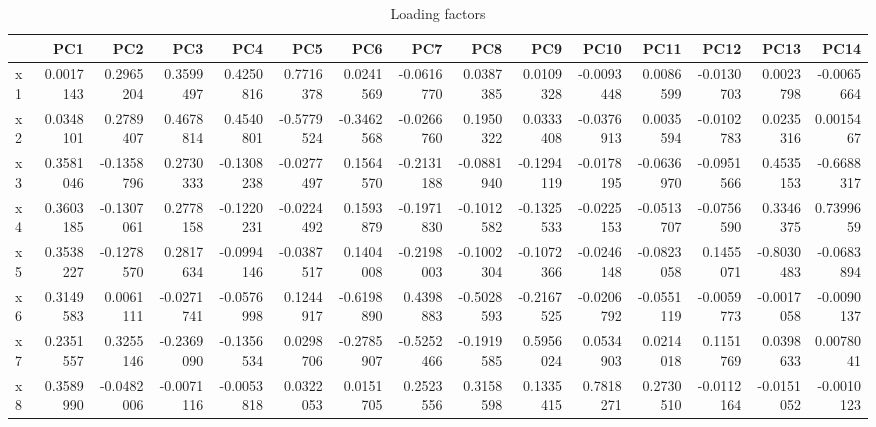 \documentclass[
]{book}
\newenvironment{Shaded}{\begin{snugshade}}{\end{snugshade}}
\newcommand{\AttributeTok}[1]{\textcolor[rgb]{0.77,0.63,0.00}{#1}}
\newcommand{\CommentTok}[1]{\textcolor[rgb]{0.56,0.35,0.01}{\textit{#1}}}
\newcommand{\ConstantTok}[1]{\textcolor[rgb]{0.00,0.00,0.00}{#1}}
\newcommand{\FunctionTok}[1]{\textcolor[rgb]{0.00,0.00,0.00}{#1}}
\newcommand{\NormalTok}[1]{#1}
\newcommand{\SpecialCharTok}[1]{\textcolor[rgb]{0.00,0.00,0.00}{#1}}
\newcommand{\StringTok}[1]{\textcolor[rgb]{0.31,0.60,0.02}{#1}}
\begin{document}
\begin{Shaded}
\end{Shaded}

\begin{table}

\caption{\label{tab:unnamed-chunk-9}Loading factors}
\centering
\begin{tabular}[t]{lrrrrrrrrrrrrrr}
\toprule
  & PC1 & PC2 & PC3 & PC4 & PC5 & PC6 & PC7 & PC8 & PC9 & PC10 & PC11 & PC12 & PC13 & PC14\\
\midrule
x1 & 0.0017143 & 0.2965204 & 0.3599497 & 0.4250816 & 0.7716378 & 0.0241569 & -0.0616770 & 0.0387385 & 0.0109328 & -0.0093448 & 0.0086599 & -0.0130703 & 0.0023798 & -0.0065664\\
x2 & 0.0348101 & 0.2789407 & 0.4678814 & 0.4540801 & -0.5779524 & -0.3462568 & -0.0266760 & 0.1950322 & 0.0333408 & -0.0376913 & 0.0035594 & -0.0102783 & 0.0235316 & 0.0015467\\
x3 & 0.3581046 & -0.1358796 & 0.2730333 & -0.1308238 & -0.0277497 & 0.1564570 & -0.2131188 & -0.0881940 & -0.1294119 & -0.0178195 & -0.0636970 & -0.0951566 & 0.4535153 & -0.6688317\\
x4 & 0.3603185 & -0.1307061 & 0.2778158 & -0.1220231 & -0.0224492 & 0.1593879 & -0.1971830 & -0.1012582 & -0.1325533 & -0.0225153 & -0.0513707 & -0.0756590 & 0.3346375 & 0.7399659\\
x5 & 0.3538227 & -0.1278570 & 0.2817634 & -0.0994146 & -0.0387517 & 0.1404008 & -0.2198003 & -0.1002304 & -0.1072366 & -0.0246148 & -0.0823058 & 0.1455071 & -0.8030483 & -0.0683894\\
\addlinespace
x6 & 0.3149583 & 0.0061111 & -0.0271741 & -0.0576998 & 0.1244917 & -0.6198890 & 0.4398883 & -0.5028593 & -0.2167525 & -0.0206792 & -0.0551119 & -0.0059773 & -0.0017058 & -0.0090137\\
x7 & 0.2351557 & 0.3255146 & -0.2369090 & -0.1356534 & 0.0298706 & -0.2785907 & -0.5252466 & -0.1919585 & 0.5956024 & 0.0534903 & 0.0214018 & 0.1151769 & 0.0398633 & 0.0078041\\
x8 & 0.3589990 & -0.0482006 & -0.0071116 & -0.0053818 & 0.0322053 & 0.0151705 & 0.2523556 & 0.3158598 & 0.1335415 & 0.7818271 & 0.2730510 & -0.0112164 & -0.0151052 & -0.0010123\\

\end{tabular}
\end{table}
\end{document}
